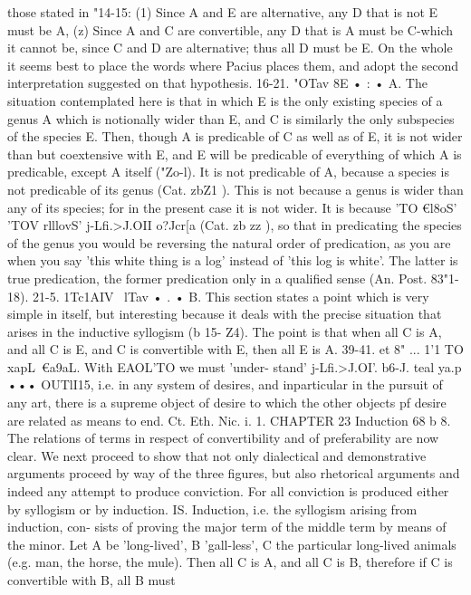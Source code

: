 {{{{{{{{{{{{those stated in "14-15: (1) Since A and E are alternative, any
D that is not E must be A, (z) Since A and C are convertible,
any D that is A must be C-which it cannot be, since C and D
are alternative; thus all D must be E.
On the whole it seems best to place the words where Pacius
places them, and adopt the second interpretation suggested on
that hypothesis.
16-21. "OTav 8E • : • A. The situation contemplated here is that
in which E is the only existing species of a genus A which is
notionally wider than E, and C is similarly the only subspecies
of the species E. Then, though A is predicable of C as well as
of E, it is not wider than but coextensive with E, and E will be
predicable of everything of which A is predicable, except A
itself ("Zo-l). It is not predicable of A, because a species is not
predicable of its genus (Cat. zbZ1 ). This is not because a genus is
wider than any of its species; for in the present case it is not
wider. It is because 'TO €l8oS' 'TOV rlllovS' j-Lfi.>J.OII o?Jcr[a (Cat. zb zz ), so
that in predicating the species of the genus you would be reversing
the natural order of predication, as you are when you say 'this
white thing is a log' instead of 'this log is white'. The latter is
true predication, the former predication only in a qualified sense
(An. Post. 83"1-18).
21-5. 1Tc1AIV ~lTav • . • B. This section states a point which
is very simple in itself, but interesting because it deals with
the precise situation that arises in the inductive syllogism
(b 15- Z4). The point is that when all C is A, and all C is E, and
C is convertible with E, then all E is A.
39-41. et 8" ... 1'1 TO xapL~€a9aL. With EAOL'TO we must 'under-
stand' j-Lfi.>J.OI'.
b6-J. teal ya.p ••• OUTlI15, i.e. in any system of desires, and inparticular in the pursuit of any art, there is a supreme object of
desire to which the other objects pf desire are related as means
to end. Ct. Eth. Nic. i. 1.
CHAPTER 23
Induction
68 b 8. The relations of terms in respect of convertibility and of
preferability are now clear. We next proceed to show that not
only dialectical and demonstrative arguments proceed by way of
the three figures, but also rhetorical arguments and indeed any
attempt to produce conviction. For all conviction is produced
either by syllogism or by induction.
IS. Induction, i.e. the syllogism arising from induction, con-
sists of proving the major term of the middle term by means of
the minor. Let A be 'long-lived', B 'gall-less', C the particular
long-lived animals (e.g. man, the horse, the mule). Then all C is
A, and all C is B, therefore if C is convertible with B, all B must
}}}}}}}}}}}}
